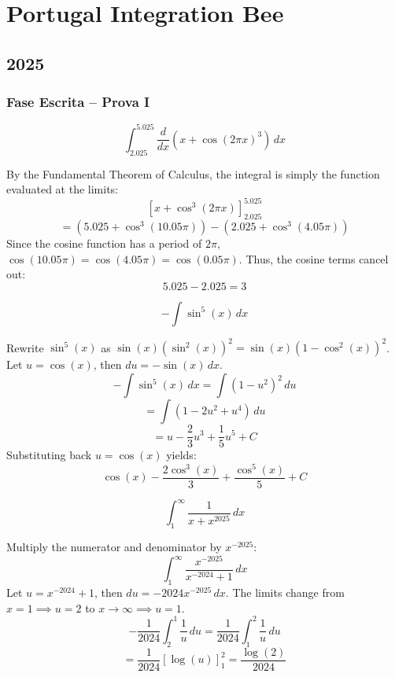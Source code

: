 \pagebreak
\section{Portugal Integration Bee}
\subsection*{2025}
\subsubsection*{Fase Escrita -- Prova I}
\begin{questions}
    \question \[\int_{2.025}^{5.025} \frac{d}{dx} \left( x + \cos(2\pi x)^3 \right) \,dx\]
    \begin{solution}
        By the Fundamental Theorem of Calculus, the integral is simply the function evaluated at the limits:
        \[\left[ x + \cos^3(2\pi x) \right]_{2.025}^{5.025}\]
        \[= \left( 5.025 + \cos^3(10.05\pi) \right) - \left( 2.025 + \cos^3(4.05\pi) \right)\]
        Since the cosine function has a period of $2\pi$, $\cos(10.05\pi) = \cos(4.05\pi) = \cos(0.05\pi)$. Thus, the cosine terms cancel out:
        \[5.025 - 2.025 = 3\]
    \end{solution}

    \question \[-\int \sin^5(x) \,dx\]
    \begin{solution}
        Rewrite $\sin^5(x)$ as $\sin(x)(\sin^2(x))^2 = \sin(x)(1-\cos^2(x))^2$. Let $u = \cos(x)$, then $du = -\sin(x)\,dx$.
        \[-\int \sin^5(x) \,dx = \int (1 - u^2)^2 \,du\]
        \[= \int (1 - 2u^2 + u^4) \,du\]
        \[= u - \frac{2}{3}u^3 + \frac{1}{5}u^5 + C\]
        Substituting back $u = \cos(x)$ yields:
        \[\cos(x) - \frac{2\cos^3(x)}{3} + \frac{\cos^5(x)}{5} + C\]
    \end{solution}

    \question \[\int_1^\infty \frac{1}{x + x^{2025}} \,dx\]
    \begin{solution}
        Multiply the numerator and denominator by $x^{-2025}$:
        \[\int_1^\infty \frac{x^{-2025}}{x^{-2024} + 1} \,dx\]
        Let $u = x^{-2024} + 1$, then $du = -2024x^{-2025} \,dx$. The limits change from $x=1 \implies u=2$ to $x\to\infty \implies u=1$.
        \[-\frac{1}{2024} \int_2^1 \frac{1}{u} \,du = \frac{1}{2024} \int_1^2 \frac{1}{u} \,du\]
        \[= \frac{1}{2024} [\log(u)]_1^2 = \frac{\log(2)}{2024}\]
    \end{solution}


\end{questions}
